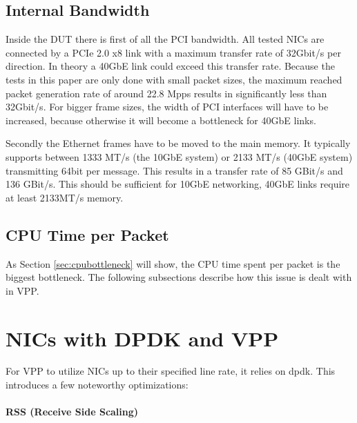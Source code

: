 
\subsection{Internal Bandwidth}


Inside the DUT there is first of all the PCI bandwidth. All tested
NICs are connected by a PCIe 2.0 x8 link with a maximum transfer rate
of 32Gbit/s per direction. In theory a 40GbE link could exceed this
transfer rate. Because the tests in this paper are only done with
small packet sizes, the maximum reached packet generation rate of
around 22.8 Mpps results in significantly less than 32Gbit/s. For
bigger frame sizes, the width of PCI interfaces will have to be
increased, because otherwise it will become a bottleneck for
40GbE links.


Secondly the Ethernet frames have to be moved to the main memory. It
typically supports between 1333 MT/s (the 10GbE system) or 2133 MT/s
(40GbE system) transmitting 64bit per message. This results in a
transfer rate of 85 GBit/s and 136 GBit/s. This should be sufficient
for 10GbE networking, 40GbE links require at least 2133MT/s memory.

\subsection{CPU Time per Packet}

As Section \ref{sec:cpubottleneck} will show, the CPU time spent per
packet is the biggest bottleneck. The following subsections describe
how this issue is dealt with in VPP.




\section{NICs with DPDK and VPP}

For VPP to utilize NICs up to their specified line rate, it relies on
\Ac{dpdk}. This introduces a few noteworthy optimizations:

\paragraph{RSS (Receive Side Scaling)}
\label{sec:rss}

